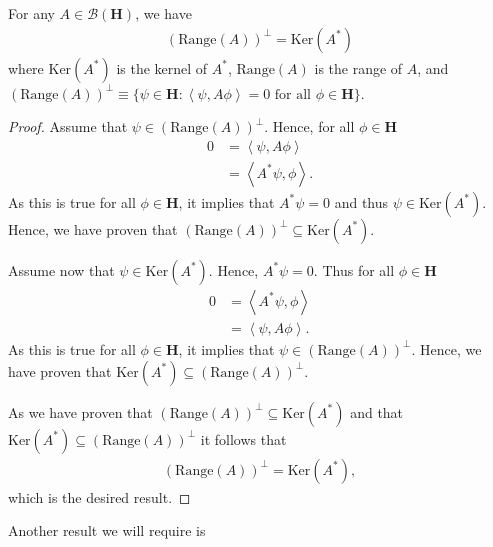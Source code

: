 \begin{proposition}
    \label{prpstn:hall-7.3}
    \leanok
    For any $A \in \mathcal{B}(\mathbf{H})$, we have
    \begin{align}
        \left( \text{Range}(A) \right)^\perp = \text{Ker}(A^*)
    \end{align}
    where $\text{Ker}(A^*)$ is the kernel of $A^*$, $\text{Range}(A)$ is the range of $A$, and $\left( \text{Range}(A) \right)^\perp \equiv \{ \psi \in \mathbf{H} : \left< \psi, A\phi \right> = 0 \text{ for all } \phi \in \mathbf{H} \}$.
\end{proposition}
\begin{proof}
    \leanok
Assume that $\psi \in \left( \text{Range}(A) \right)^\perp$. Hence, for all $\phi \in \mathbf{H}$
\begin{align}
    0 &= \left< \psi, A\phi \right> \\
      &= \left< A^*\psi, \phi \right>.
\end{align}
As this is true for all $\phi \in \mathbf{H}$, it implies that $A^*\psi = 0$ and thus $\psi \in \text{Ker}(A^*)$. Hence, we have proven that $\left( \text{Range}(A) \right)^\perp \subseteq \text{Ker}(A^*)$.

Assume now that $\psi \in \text{Ker}(A^*)$. Hence, $A^*\psi = 0$. Thus for all $\phi \in \mathbf{H}$
\begin{align}
    0 &= \left< A^*\psi, \phi \right>  \\
      &= \left< \psi, A\phi \right>.
\end{align}
As this is true for all $\phi \in \mathbf{H}$, it implies that $\psi \in \left( \text{Range}(A) \right)^\perp$. Hence, we have proven that $\text{Ker}(A^*) \subseteq \left( \text{Range}(A) \right)^\perp$.

As we have proven that $\left( \text{Range}(A) \right)^\perp \subseteq \text{Ker}(A^*)$ and that $\text{Ker}(A^*) \subseteq \left( \text{Range}(A) \right)^\perp$ it follows that
\begin{align}
    \left( \text{Range}(A) \right)^\perp = \text{Ker}(A^*),
\end{align}
which is the desired result.
\end{proof}

Another result we will require is


